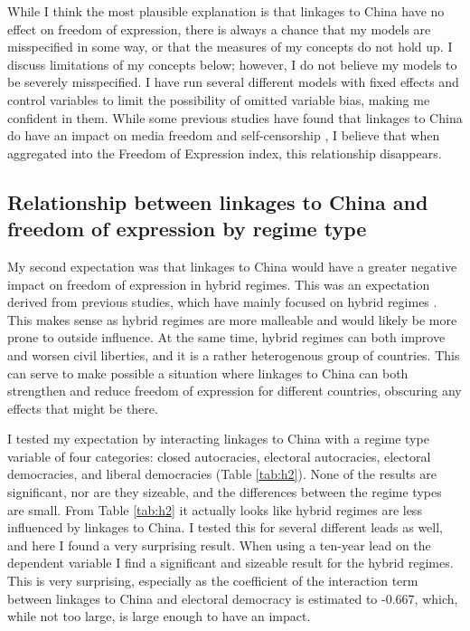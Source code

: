 While I think the most plausible explanation is that linkages to China have no effect on freedom of expression, there is always a chance that my models are misspecified in some way, or that the measures of my concepts do not hold up. I discuss limitations of my concepts below; however, I do not believe my models to be severely misspecified. I have run several different models with fixed effects and control variables to limit the possibility of omitted variable bias, making me confident in them. While some previous studies have found that linkages to China do have an impact on media freedom and self-censorship \citep{gamso_is_2021, toettoe_foreign_2023}, I believe that when aggregated into the Freedom of Expression index, this relationship disappears. 

\subsection{Relationship between linkages to China and freedom of expression by regime type}
My second expectation was that linkages to China would have a greater negative impact on freedom of expression in hybrid regimes. This was an expectation derived from previous studies, which have mainly focused on hybrid regimes \citep{tansey_ties_2017, toettoe_foreign_2023}. This makes sense as hybrid regimes are more malleable and would likely be more prone to outside influence. At the same time, hybrid regimes can both improve and worsen civil liberties, and it is a rather heterogenous group of countries. This can serve to make possible a situation where linkages to China can both strengthen and reduce freedom of expression for different countries, obscuring any effects that might be there.

I tested my expectation by interacting linkages to China with a regime type variable of four categories: closed autocracies, electoral autocracies, electoral democracies, and liberal democracies (Table \ref{tab:h2}). None of the results are significant, nor are they sizeable, and the differences between the regime types are small. From Table \ref{tab:h2} it actually looks like hybrid regimes are less influenced by linkages to China. I tested this for several different leads as well, and here I found a very surprising result. When using a ten-year lead on the dependent variable I find a significant and sizeable result for the hybrid regimes. This is very surprising, especially as the coefficient of the interaction term between linkages to China and electoral democracy is estimated to -0.667, which, while not too large, is large enough to have an impact.

